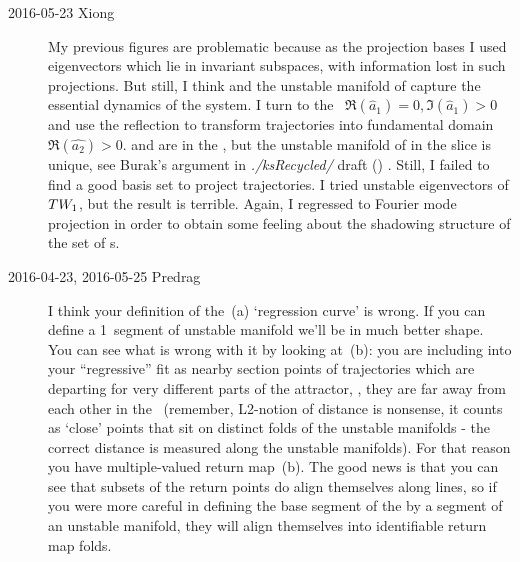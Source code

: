 \begin{description}
\item[2016-05-23 Xiong]
  My previous figures are problematic because as the projection bases
  I used  eigenvectors
  which lie in invariant subspaces, with information lost
  in such projections. But still, I think  and the unstable
  manifold of  capture the essential dynamics of the system.
  I turn to the \fFslice\ $\Re(\hat{a}_1) = 0, \Im(\hat{a}_1) > 0$
  and use the reflection to transform trajectories into fundamental
  domain $\Re(\hat{a_2}) > 0$.  and  are in the {\sliceBord}, but
  the unstable manifold of  in the slice is unique, see
  Burak's argument in \emph{./ksRecycled/} draft
  ()%
  .
  Still, I failed to  find a good basis set to project trajectories. I
  tried unstable eigenvectors of $TW_{1}$, but the result is terrible.
  Again, I regressed to Fourier mode projection in order to obtain some
  feeling about the shadowing structure of the set of \rpo s.

\item[2016-04-23, 2016-05-25 Predrag]
I think your definition of the \,(a) `regression
curve' is wrong. If you can define a 1\dmn\ segment of unstable manifold
we'll be in much better shape. You can see what is wrong with it by
looking at \,(b): you are including into your
``regressive'' fit as nearby section points of trajectories which are
departing for very different parts of the attractor, \ie, they are far
away from each other in the \PoincSec\ (remember, L2-notion of distance
is nonsense, it counts as `close' points that sit on distinct folds of
the unstable manifolds - the correct distance is measured along the
unstable manifolds). For that reason you have multiple-valued return map
\,(b). The good news is that you can see that
subsets of the return points do align themselves along lines, so if you
were more careful in defining the base segment of the {\PoincSec} by a
segment of an unstable manifold, they will align themselves into
identifiable return map folds.


\end{description}
